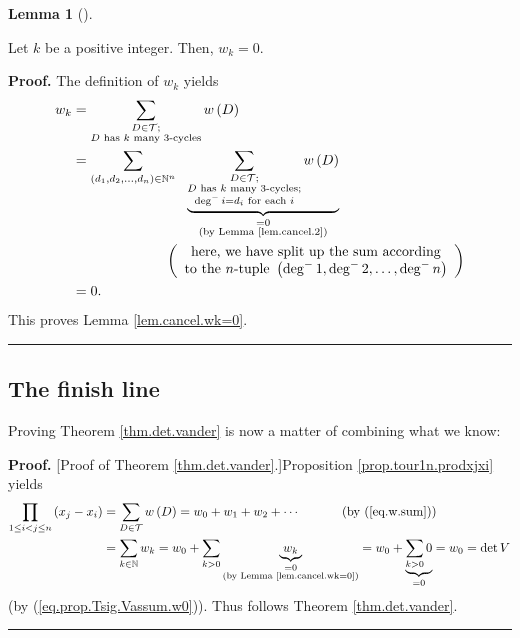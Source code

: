 \documentclass[numbers=enddot,12pt,final,onecolumn,notitlepage]{scrartcl}%
\numberwithin{exer}{subsection}
\theoremstyle{definition}
\newtheorem{lem}[theo]{Lemma}
\newenvironment{lemma}[1][]
{\begin{lem}[#1]\begin{leftbar}}
{\end{leftbar}\end{lem}}
\newenvironment{proof}[1][Proof]{\noindent\textbf{#1.} }{\ \rule{0.5em}{0.5em}}
\let\sumnonlimits\sum
\let\prodnonlimits\prod
\renewcommand{\sum}{\sumnonlimits\limits}
\renewcommand{\prod}{\prodnonlimits\limits}
\begin{document}
\begin{lemma}
\label{lem.cancel.wk=0}Let $k$ be a positive integer. Then, $w_{k}=0$.
\end{lemma}

\begin{proof}
The definition of $w_{k}$ yields%
\begin{align*}
w_{k} &  =\sum_{\substack{D\in\mathcal{T};\\D\text{ has }k\text{ many
}3\text{-cycles}}}w\left(  D\right)  \\
&  =\sum_{\left(  d_{1},d_{2},\ldots,d_{n}\right)  \in\mathbb{N}^{n}%
}\ \ \underbrace{\sum_{\substack{D\in\mathcal{T};\\D\text{ has }k\text{ many
}3\text{-cycles};\\\deg^{-}i=d_{i}\text{ for each }i}}w\left(  D\right)
}_{\substack{=0\\\text{(by Lemma \ref{lem.cancel.2})}}}\\
&  \ \ \ \ \ \ \ \ \ \ \ \ \ \ \ \ \ \ \ \ \left(
\begin{array}
[c]{c}%
\text{here, we have split up the sum according}\\
\text{to the }n\text{-tuple }\left(  \deg^{-}1,\deg^{-}2,\ldots,\deg
^{-}n\right)
\end{array}
\right)  \\
&  =0.
\end{align*}
This proves Lemma \ref{lem.cancel.wk=0}.
\end{proof}

\subsection{The finish line}

Proving Theorem \ref{thm.det.vander} is now a matter of combining what we know:

\begin{proof}
[Proof of Theorem \ref{thm.det.vander}.]Proposition \ref{prop.tour1n.prodxjxi}
yields%
\begin{align*}
\prod_{1\leq i<j\leq n}\left(  x_{j}-x_{i}\right)   &  =\sum_{D\in\mathcal{T}%
}w\left(  D\right)  =w_{0}+w_{1}+w_{2}+\cdots\ \ \ \ \ \ \ \ \ \ \left(
\text{by (\ref{eq.w.sum})}\right)  \\
&  =\sum_{k\in\mathbb{N}}w_{k}=w_{0}+\sum_{k>0}\underbrace{w_{k}%
}_{\substack{=0\\\text{(by Lemma \ref{lem.cancel.wk=0})}}}=w_{0}%
+\underbrace{\sum_{k>0}0}_{=0}=w_{0}=\det V
\end{align*}
(by (\ref{eq.prop.Tsig.Vassum.w0})). Thus follows Theorem \ref{thm.det.vander}.
\end{proof}
\end{document}
